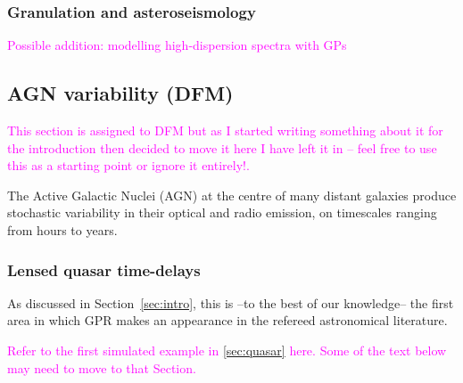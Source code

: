 \documentclass[letterpaper]{ar-1col}
\newcommand{\suz}[1]{\textcolor{magenta}{#1}}
\begin{document}
\subsubsection{Granulation and asteroseismology}


\suz{Possible addition: modelling high-dispersion spectra with GPs}

\subsection{AGN variability (DFM)}

\suz{This section is assigned to DFM but as I started writing something about it for the introduction then decided to move it here I have left it in -- feel free to use this as a starting point or ignore it entirely!.}

The Active Galactic Nuclei (AGN) at the centre of many distant galaxies produce stochastic variability in their optical and radio emission, on timescales ranging from hours to years.

\subsubsection{Lensed quasar time-delays}

As discussed in Section~\ref{sec:intro}, this is --to the best of our knowledge-- the first area in which GPR makes an appearance in the refereed astronomical literature.

\suz{Refer to the first simulated example in \autoref{sec:quasar} here. Some of the text below may need to move to that Section.}
\end{document}
